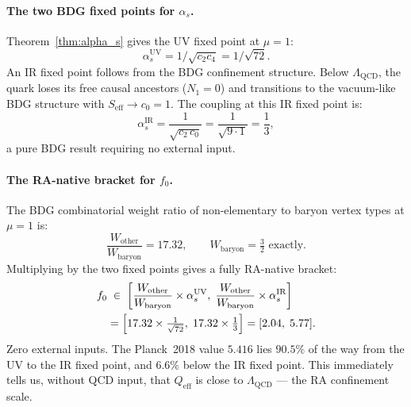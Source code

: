 \documentclass[11pt,a4paper]{article}
\begin{document}
\paragraph{The two BDG fixed points for $\alpha_s$.}
Theorem~\ref{thm:alpha_s} gives the UV fixed point at $\mu=1$:
\begin{equation}
  \alpha_s^{\mathrm{UV}} = 1/\sqrt{c_2 c_4} = 1/\sqrt{72}.
\end{equation}
An IR fixed point follows from the BDG confinement structure.  Below
$\Lambda_{\mathrm{QCD}}$, the quark loses its free causal ancestors ($N_1=0$)
and transitions to the vacuum-like BDG structure with $S_{\mathrm{eff}}\to c_0=1$.
The coupling at this IR fixed point is:
\begin{equation}
  \alpha_s^{\mathrm{IR}} = \frac{1}{\sqrt{c_2\,c_0}}
  = \frac{1}{\sqrt{9\cdot 1}} = \frac{1}{3},
  \label{eq:alpha_IR}
\end{equation}
a pure BDG result requiring no external input.

\paragraph{The RA-native bracket for $f_0$.}
The BDG combinatorial weight ratio of non-elementary to baryon vertex
types at $\mu=1$ is:
\begin{equation}
  \frac{W_{\mathrm{other}}}{W_{\mathrm{baryon}}} = 17.32,
  \qquad W_{\mathrm{baryon}} = \tfrac{3}{2} \text{ exactly.}
\end{equation}
Multiplying by the two fixed points gives a fully RA-native bracket:
\begin{align}
  f_0 &\;\in\; \left[
    \frac{W_{\mathrm{other}}}{W_{\mathrm{baryon}}} \times \alpha_s^{\mathrm{UV}},\;
    \frac{W_{\mathrm{other}}}{W_{\mathrm{baryon}}} \times \alpha_s^{\mathrm{IR}}
  \right] \notag\\
  &= \left[17.32 \times \tfrac{1}{\sqrt{72}},\;
         17.32 \times \tfrac{1}{3}\right]
  = [2.04,\; 5.77]. \label{eq:f0_bracket}
\end{align}
Zero external inputs.  The Planck~2018 value $5.416$ lies $90.5\%$ of
the way from the UV to the IR fixed point, and $6.6\%$ below the IR
fixed point.  This immediately tells us, without QCD input, that
$Q_{\mathrm{eff}}$ is close to $\Lambda_{\mathrm{QCD}}$ --- the RA
confinement scale.
\end{document}
